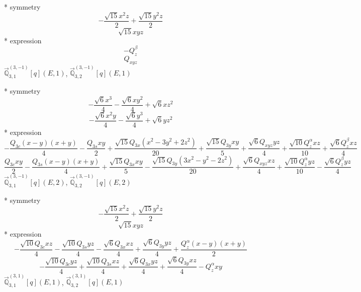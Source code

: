 \documentclass[fleqn,8pt]{jsarticle}
\begin{document}
\noindent\quad ** symmetry
\begin{dmath*}
- \frac{\sqrt{15} x^{2} z}{2} + \frac{\sqrt{15} y^{2} z}{2}
\end{dmath*}
\begin{dmath*}
\sqrt{15} x y z
\end{dmath*}
\noindent\quad ** expression
\begin{dmath*}
- Q_{z}^{\beta}
\end{dmath*}
\begin{dmath*}
Q_{xyz}
\end{dmath*}
\noindent\quad $\vec{\mathbb{Q}}_{3,1}^{(3,-1)}[q](E,1)$, $\vec{\mathbb{Q}}_{3,2}^{(3,-1)}[q](E,1)$

\noindent\quad ** symmetry
\begin{dmath*}
- \frac{\sqrt{6} x^{3}}{4} - \frac{\sqrt{6} x y^{2}}{4} + \sqrt{6} x z^{2}
\end{dmath*}
\begin{dmath*}
- \frac{\sqrt{6} x^{2} y}{4} - \frac{\sqrt{6} y^{3}}{4} + \sqrt{6} y z^{2}
\end{dmath*}
\noindent\quad ** expression
\begin{dmath*}
- \frac{Q_{3c} \left(x - y\right) \left(x + y\right)}{4} - \frac{Q_{3s} x y}{2} + \frac{\sqrt{15} Q_{3x} \left(x^{2} - 3 y^{2} + 2 z^{2}\right)}{20} + \frac{\sqrt{15} Q_{3y} x y}{5} + \frac{\sqrt{6} Q_{xyz} y z}{4} + \frac{\sqrt{10} Q_{z}^{\alpha} x z}{10} + \frac{\sqrt{6} Q_{z}^{\beta} x z}{4}
\end{dmath*}
\begin{dmath*}
\frac{Q_{3c} x y}{2} - \frac{Q_{3s} \left(x - y\right) \left(x + y\right)}{4} + \frac{\sqrt{15} Q_{3x} x y}{5} - \frac{\sqrt{15} Q_{3y} \left(3 x^{2} - y^{2} - 2 z^{2}\right)}{20} + \frac{\sqrt{6} Q_{xyz} x z}{4} + \frac{\sqrt{10} Q_{z}^{\alpha} y z}{10} - \frac{\sqrt{6} Q_{z}^{\beta} y z}{4}
\end{dmath*}
\noindent\quad $\vec{\mathbb{Q}}_{3,1}^{(3,-1)}[q](E,2)$, $\vec{\mathbb{Q}}_{3,2}^{(3,-1)}[q](E,2)$

\noindent\quad ** symmetry
\begin{dmath*}
- \frac{\sqrt{15} x^{2} z}{2} + \frac{\sqrt{15} y^{2} z}{2}
\end{dmath*}
\begin{dmath*}
\sqrt{15} x y z
\end{dmath*}
\noindent\quad ** expression
\begin{dmath*}
- \frac{\sqrt{10} Q_{3c} x z}{4} - \frac{\sqrt{10} Q_{3s} y z}{4} - \frac{\sqrt{6} Q_{3x} x z}{4} + \frac{\sqrt{6} Q_{3y} y z}{4} + \frac{Q_{z}^{\alpha} \left(x - y\right) \left(x + y\right)}{2}
\end{dmath*}
\begin{dmath*}
- \frac{\sqrt{10} Q_{3c} y z}{4} + \frac{\sqrt{10} Q_{3s} x z}{4} + \frac{\sqrt{6} Q_{3x} y z}{4} + \frac{\sqrt{6} Q_{3y} x z}{4} - Q_{z}^{\alpha} x y
\end{dmath*}
\noindent\quad $\vec{\mathbb{Q}}_{3,1}^{(3,1)}[q](E,1)$, $\vec{\mathbb{Q}}_{3,2}^{(3,1)}[q](E,1)$
\end{document}
